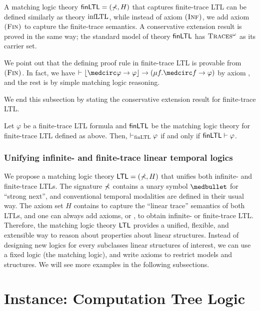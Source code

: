 \documentclass{amsart}
\begin{document}
A matching logic theory $\mathsf{finLTL} = (\mathbb{\Sigma}, H)$ that captures finite-trace LTL
can be defined similarly as theory $\mathrm{infLTL}$,
while instead of axiom $\textsc{(Inf)}$, we add axiom $\textsc{(Fin)}$ to capture the finite-trace
semantics.
A conservative extension result is proved in the same way;
the standard model of theory $\mathsf{finLTL}$ has $\textsc{Traces$^\omega$}$ as its carrier set.

We point out that the defining proof rule  in finite-trace LTL
is provable from $\textsc{(Fin)}$.
In fact, we have 
$\vdash \floor{\wnext \varphi \imp \varphi} \imp (\mu f . \wnext f \imp
\varphi)$
by axiom \Lfp,
and the rest is by simple matching logic reasoning.

We end this subsection by stating the conservative extension result for
finite-trace LTL.

\begin{theorem}
	\label{thm_csrvext_finLTL}
	Let  $\varphi$ be a finite-trace LTL formula
	and $\mathsf{finLTL}$ be the matching logic theory for finite-trace LTL defined as
	above.
	Then,  $\vdash_{\mathrm{finLTL}} \varphi$ if and only if
	$\mathsf{finLTL} \vdash \varphi$.
\end{theorem}

\subsubsection{Unifying infinite- and finite-trace linear temporal logics}

We propose a matching logic theory $\mathsf{LTL} = (\mathbb{\Sigma}, H)$ that unifies both
infinite- and finite-trace LTLs.
The signature $\mathbb{\Sigma}$ contains a unary symbol $\snext$ for ``strong next'',
and conventional temporal modalities are defined in their usual way.
The axiom set $H$ contains \Lin to capture the ``linear trace'' semantics
of both LTLs, and one can always add axioms, \Inf or \Fin, to obtain
infinite- or finite-trace LTL.
Therefore, the matching logic theory $\mathsf{LTL}$ provides a unified, flexible, and
extensible
way to reason about properties about linear structures.
Instead of designing new logics for every subclasses linear structures of
interest,
we can use a fixed logic (the matching logic), and 
write axioms to restrict models and structures.
We will see more examples in the following subsections.

\section{Instance: Computation Tree Logic}
\label{sec_CTL}
\end{document}
